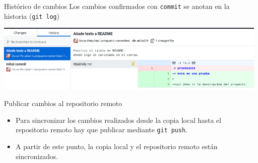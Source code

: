 \documentclass[aspectratio=169, xcolor={usenames,svgnames,dvipsnames}]{beamer}
\begin{document}
\begin{frame}[fragile,label={sec:orge3a81c0}]{Histórico de cambios}
 Los cambios confirmados con \texttt{commit} se anotan en la historia (\texttt{git log})

\begin{center}
\end{center}

\begin{center}
\includegraphics[width=.9\linewidth]{figs/git_history.png}
\end{center}
\end{frame}


\begin{frame}[fragile,label={sec:org159c8ff}]{Publicar cambios al repositorio remoto}
 \begin{itemize}
\item Para sincronizar  los cambios realizados \alert{desde la copia local hasta el repositorio remoto} hay que publicar mediante \texttt{git push}.
\end{itemize}

\begin{center}
\end{center}

\begin{itemize}
\item A partir de este punto, la copia local y el repositorio remoto están sincronizados.
\end{itemize}
\end{frame}
\end{document}
